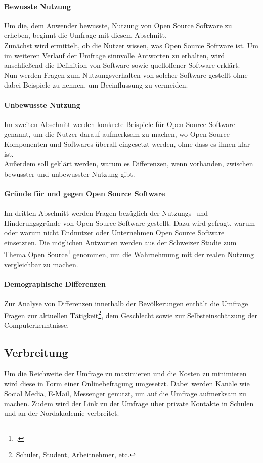 \documentclass[a4paper]{article}
\begin{document}
			\paragraph{Bewusste Nutzung}
				Um die, dem Anwender bewusste, Nutzung von Open Source Software zu erheben, beginnt die Umfrage mit diesem Abschnitt.\\
				Zunächst wird ermittelt, ob die Nutzer wissen, was Open Source Software ist. Um im weiteren Verlauf der Umfrage sinnvolle Antworten zu erhalten, wird anschließend die Definition von Software sowie quelloffener Software erklärt.\\
				Nun werden Fragen zum Nutzungsverhalten von solcher Software gestellt ohne dabei Beispiele zu nennen, um Beeinflussung zu vermeiden.
			
			\paragraph{Unbewusste Nutzung}
				Im zweiten Abschnitt werden konkrete Beispiele für Open Source Software genannt, um die Nutzer darauf aufmerksam zu machen, wo Open Source Komponenten und Softwares überall eingesetzt werden, ohne dass es ihnen klar ist.\\
				Außerdem soll geklärt werden, warum es Differenzen, wenn vorhanden, zwischen bewusster und unbewusster Nutzung gibt.
			
			\paragraph{Gründe für und gegen Open Source Software}
				Im dritten Abschnitt werden Fragen bezüglich der Nutzungs- und Hinderungsgründe von Open Source Software gestellt. Dazu wird gefragt, warum oder warum nicht Endnutzer oder Unternehmen Open Source Software einsetzten. Die möglichen Antworten werden aus der Schweizer Studie zum Thema Open Source\footcite{oss:studie} genommen, um die Wahrnehmung mit der realen Nutzung vergleichbar zu machen.
			
			\paragraph{Demographische Differenzen}
				Zur Analyse von Differenzen innerhalb der Bevölkerungen enthält die Umfrage Fragen zur aktuellen Tätigkeit\footnote{Schüler, Student, Arbeitnehmer, etc.}, dem Geschlecht sowie zur Selbsteinschätzung der Computerkenntnisse.
				
		\subsection{Verbreitung}
			Um die Reichweite der Umfrage zu maximieren und die Kosten zu minimieren wird diese in Form einer Onlinebefragung umgesetzt. Dabei werden Kanäle wie Social Media, E-Mail, Messenger genutzt, um auf die Umfrage aufmerksam zu machen. Zudem wird der Link zu der Umfrage über private Kontakte in Schulen und an der Nordakademie verbreitet.
	   
\end{document}
